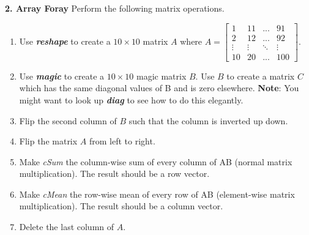 \documentclass[11pt]{article}
\newenvironment{qparts}{\begin{enumerate}[{(}a{)}]}{\end{enumerate}}
\begin{document}
\noindent
\newline
\textbf{2. Array Foray} Perform the following matrix operations. 
\begin{qparts}
    \item Use \textbf{\textit{reshape}} to create a $10 \times 10$ matrix $A$ where 
    $A = \begin{bmatrix}1 &11 & ...& 91\\ 2&12&...&92\\ \vdots&\vdots&\ddots&\vdots\\ 10&20&...&100\end{bmatrix}$.

    \item Use \textbf{\textit{magic}} to create a $10 \times 10$ magic matrix $B$. 
    Use $B$ to create a matrix $C$ which has the same diagonal values of B and is zero elsewhere. 
    \textbf{Note}: You might want to look up \textbf{\textit{diag}} to see how to do this elegantly. 

    \item Flip the second column of $B$ such that the column is inverted up down.

    \item Flip the matrix $A$ from left to right.

    \item Make \textit{cSum} the column-wise sum of every column of AB (normal matrix multiplication).
    The result should be a row vector.

    \item Make \textit{cMean} the row-wise mean of every row of AB (element-wise matrix multiplication).
    The result should be a column vector.

    \item Delete the last column of $A$. 
\end{qparts}
\end{document}
